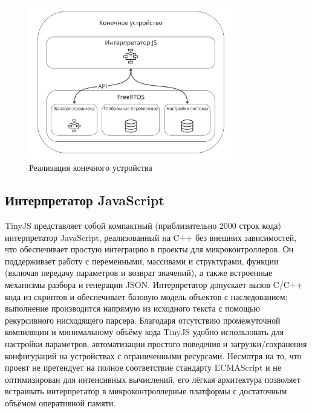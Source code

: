 \documentclass[14pt, a4paper]{extreport}
\begin{document}
\begin{figure}[ht]
    \centering
    \includegraphics[width=0.8\textwidth]{images/Fig05.png}
    \caption{Реализация конечного устройства}
    \label{fig:end_device}
\end{figure}

\subsection{Интерпретатор JavaScript}

TinyJS представляет собой компактный (приблизительно 2000 строк кода) интерпретатор JavaScript, реализованный на C++ без внешних зависимостей, что обеспечивает простую интеграцию
в проекты для микроконтроллеров. Он поддерживает работу с переменными, массивами и структурами, функции (включая передачу параметров и возврат значений), а также встроенные механизмы
разбора и генерации JSON. Интерпретатор допускает вызов C/C++ кода из скриптов и обеспечивает базовую модель объектов с наследованием; выполнение производится напрямую из исходного
текста с помощью рекурсивного нисходящего парсера. Благодаря отсутствию промежуточной компиляции и минимальному объёму кода TinyJS удобно использовать для настройки параметров,
автоматизации простого поведения и загрузки/сохранения конфигураций на устройствах с ограниченными ресурсами. Несмотря на то, что проект не претендует на полное соответствие стандарту
ECMAScript и не оптимизирован для интенсивных вычислений, его лёгкая архитектура позволяет встраивать интерпретатор в микроконтроллерные платформы с достаточным объёмом оперативной
памяти.


\end{document}
